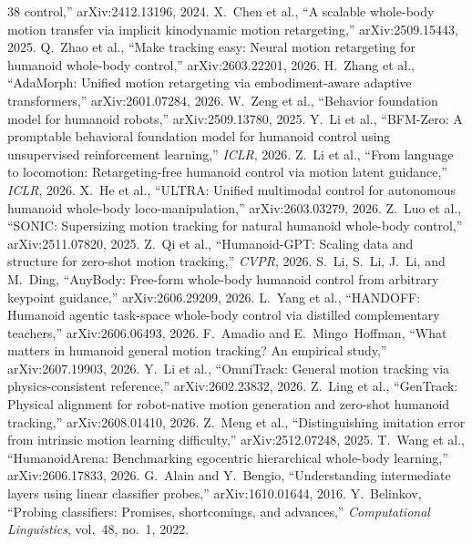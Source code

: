 \documentclass[conference]{IEEEtran}
\begin{document}
\begin{thebibliography}{38}
control,'' arXiv:2412.13196, 2024.
 X.~Chen et al., ``A scalable whole-body motion transfer via implicit
kinodynamic motion retargeting,'' arXiv:2509.15443, 2025.
 Q.~Zhao et al., ``Make tracking easy: Neural motion retargeting for
humanoid whole-body control,'' arXiv:2603.22201, 2026.
 H.~Zhang et al., ``AdaMorph: Unified motion retargeting via
embodiment-aware adaptive transformers,'' arXiv:2601.07284, 2026.
 W.~Zeng et al., ``Behavior foundation model for humanoid robots,''
arXiv:2509.13780, 2025.
 Y.~Li et al., ``BFM-Zero: A promptable behavioral foundation model for
humanoid control using unsupervised reinforcement learning,'' \emph{ICLR}, 2026.
 Z.~Li et al., ``From language to locomotion: Retargeting-free humanoid
control via motion latent guidance,'' \emph{ICLR}, 2026.
 X.~He et al., ``ULTRA: Unified multimodal control for autonomous humanoid
whole-body loco-manipulation,'' arXiv:2603.03279, 2026.
 Z.~Luo et al., ``SONIC: Supersizing motion tracking for natural humanoid
whole-body control,'' arXiv:2511.07820, 2025.
 Z.~Qi et al., ``Humanoid-GPT: Scaling data and structure for
zero-shot motion tracking,'' \emph{CVPR}, 2026.
 S.~Li, S.~Li, J.~Li, and M.~Ding, ``AnyBody: Free-form whole-body
humanoid control from arbitrary keypoint guidance,'' arXiv:2606.29209, 2026.
 L.~Yang et al., ``HANDOFF: Humanoid agentic task-space whole-body
control via distilled complementary teachers,'' arXiv:2606.06493, 2026.
 F.~Amadio and E.~Mingo~Hoffman, ``What matters in humanoid general
motion tracking? An empirical study,'' arXiv:2607.19903, 2026.
 Y.~Li et al., ``OmniTrack: General motion tracking via
physics-consistent reference,'' arXiv:2602.23832, 2026.
 Z.~Ling et al., ``GenTrack: Physical alignment for robot-native motion
generation and zero-shot humanoid tracking,'' arXiv:2608.01410, 2026.
 Z.~Meng et al., ``Distinguishing imitation error from intrinsic motion
learning difficulty,'' arXiv:2512.07248, 2025.
 T.~Wang et al., ``HumanoidArena: Benchmarking egocentric
hierarchical whole-body learning,'' arXiv:2606.17833, 2026.
 G.~Alain and Y.~Bengio, ``Understanding intermediate layers using
linear classifier probes,'' arXiv:1610.01644, 2016.
 Y.~Belinkov, ``Probing classifiers: Promises, shortcomings, and
advances,'' \emph{Computational Linguistics}, vol.~48, no.~1, 2022.

\end{thebibliography}
\end{document}
